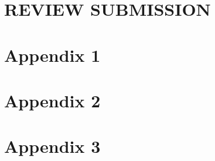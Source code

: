 \documentclass[12pt,a4paper,man,natbib,donotrepeattitle, book]{apa6}
\begin{document}
\section{REVIEW SUBMISSION}
%

\section{Appendix 1}
%

\section{Appendix 2}
%

\section{Appendix 3}
%
\end{document}
